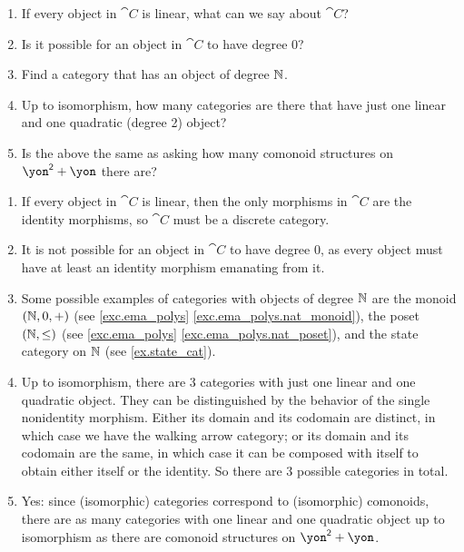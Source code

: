 \documentclass[Book-Poly]{subfiles}
\begin{document}
\begin{exercise}
\begin{enumerate}
	\item If every object in $\cat{C}$ is linear, what can we say about $\cat{C}$?
	\item Is it possible for an object in $\cat{C}$ to have degree $0$?
	\item Find a category that has an object of degree $\mathbb{N}$.
	\item Up to isomorphism, how many categories are there that have just one linear and one quadratic (degree 2) object?
	\item Is the above the same as asking how many comonoid structures on $\yon^\2+\yon$ there are?\qedhere
\end{enumerate}
\begin{solution}
\begin{enumerate}
    \item If every object in $\cat{C}$ is linear, then the only morphisms in $\cat{C}$ are the identity morphisms, so $\cat{C}$ must be a discrete category.
    \item It is not possible for an object in $\cat{C}$ to have degree $0$, as every object must have at least an identity morphism emanating from it.
    \item Some possible examples of categories with objects of degree $\mathbb{N}$ are the monoid $(\mathbb{N}, 0, +)$ (see \cref{exc.ema_polys} \cref{exc.ema_polys.nat_monoid}), the poset $(\mathbb{N}, \leq)$ (see \cref{exc.ema_polys} \cref{exc.ema_polys.nat_poset}), and the state category on $\mathbb{N}$ (see \cref{ex.state_cat}).
    \item Up to isomorphism, there are $3$ categories with just one linear and one quadratic object.
    They can be distinguished by the behavior of the single nonidentity morphism.
    Either its domain and its codomain are distinct, in which case we have the walking arrow category; or its domain and its codomain are the same, in which case it can be composed with itself to obtain either itself or the identity.
    So there are $3$ possible categories in total.
    \item Yes: since (isomorphic) categories correspond to (isomorphic) comonoids, there are as many categories with one linear and one quadratic object up to isomorphism as there are comonoid structures on $\yon^\2+\yon$.
\end{enumerate}
\end{solution}
\end{exercise}
\end{document}
